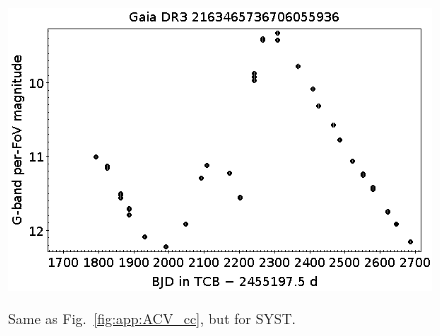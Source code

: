 \documentclass[longauth]{aa}
\begin{document}
\begin{appendix}
\begin{figure}
\hspace{2mm}
 \includegraphics[width=0.45\hsize]{figures/appendix/SYST-21.png} \\
\vspace{4mm}
 \caption{Same as Fig.~\ref{fig:app:ACV_cc}, but for SYST.}
 \label{fig:app:SYST_cc}
\end{figure}




\end{appendix}
\end{document}
